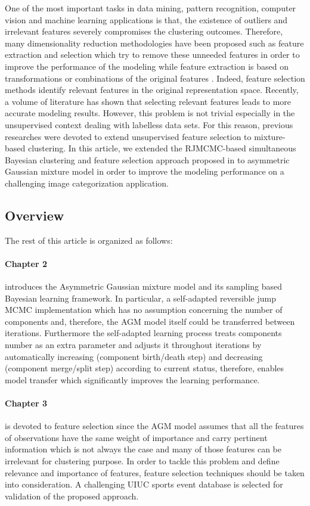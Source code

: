 One of the most important tasks in data mining, pattern recognition, computer vision and machine learning applications is that, the existence of outliers and irrelevant features severely compromises the clustering outcomes. Therefore, many dimensionality reduction methodologies have been proposed \cite{Bouguila2011b,Boutemedjet2009} such as feature extraction and selection which try to remove these unneeded features in order to improve the performance of the modeling \cite{Raudys1991,Kohavi1997} while feature extraction is based on transformations or combinations of the original features \cite{Mao2005}. Indeed, feature selection methods identify relevant features in the original representation space. Recently, a volume of literature \cite{Tsai2008,Dy2004} has shown that selecting relevant features leads to more accurate modeling results. However, this problem is not trivial especially in the unsupervised context dealing with labelless data sets. For this reason, previous researches \cite{Law2004,Elguebaly2013,Elguebaly2015} were devoted to extend unsupervised feature selection to mixture-based clustering. In this article, we extended the RJMCMC-based simultaneous Bayesian clustering and feature selection approach proposed in \cite{Elguebaly2013} to asymmetric Gaussian mixture model in order to improve the modeling performance on a challenging image categorization application.

\subsection{Overview}
\label{sec:1.5}
The rest of this article is organized as follows:

\paragraph{Chapter 2} introduces the Asymmetric Gaussian mixture model and its sampling based Bayesian learning framework. In particular, a self-adapted reversible jump MCMC implementation which has no assumption concerning the number of components and, therefore, the AGM model itself could be transferred between iterations. Furthermore the self-adapted learning process treats components number as an extra parameter and adjusts it throughout iterations by automatically increasing (component birth/death step) and decreasing (component merge/split step) according to current status, therefore, enables model transfer which significantly improves the learning performance.
\paragraph{Chapter 3} is devoted to feature selection since the AGM model assumes that all the features of observations have the same weight of importance and carry pertinent information which is not always the case and many of those features can be irrelevant for clustering purpose. In order to tackle this problem and define relevance and importance of features, feature selection techniques should be taken into consideration. A challenging UIUC sports event database is selected for validation of the proposed approach.

